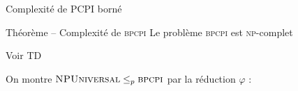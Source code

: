 
\begingroup

\begin{frame}{Complexité de PCPI borné}

  \vspace{-4mm}
  
  \begin{block}{Théorème -- Complexité de \textsc{bpcpi}}
    Le problème \textsc{bpcpi} est \textsc{np}-complet

    \vspace{2mm}
     Voir TD

    \vspace{1mm}
     On montre $\textsc{NPUniversal} \leq_p \textsc{bpcpi}$ par la réduction $\varphi$ :


\end{block}
\end{frame}
